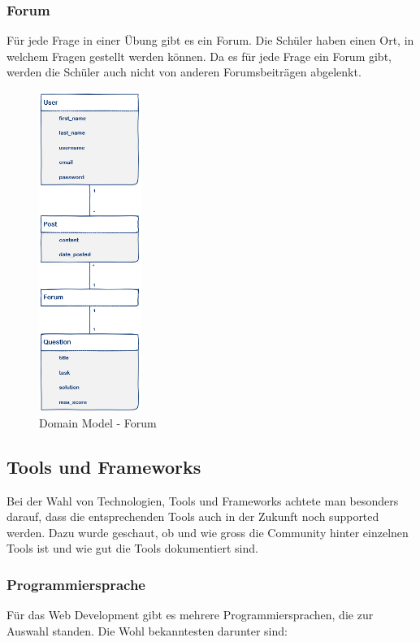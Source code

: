 \subsubsection*{Forum}
Für jede Frage in einer Übung gibt es ein Forum. Die Schüler haben einen Ort, in welchem Fragen gestellt werden können. Da es für jede Frage ein Forum gibt, werden die Schüler auch nicht von anderen Forumsbeiträgen abgelenkt.
\begin{figure}[H]
\begin{center}
	\includegraphics[width=0.3\textwidth, keepaspectratio]{images/domain_model_forum.png}
	\caption{Domain Model - Forum}
	\label{fig:domain_model_forum}
\end{center}
\end{figure}


\subsection{Tools und Frameworks}
Bei der Wahl von Technologien, Tools und Frameworks achtete man besonders darauf, dass die entsprechenden Tools auch in der Zukunft noch supported werden. Dazu wurde geschaut, ob und wie gross die Community hinter einzelnen Tools ist und wie gut die Tools dokumentiert sind.

\subsubsection*{Programmiersprache}
Für das Web Development gibt es mehrere Programmiersprachen, die zur Auswahl standen. Die Wohl bekanntesten darunter sind:

